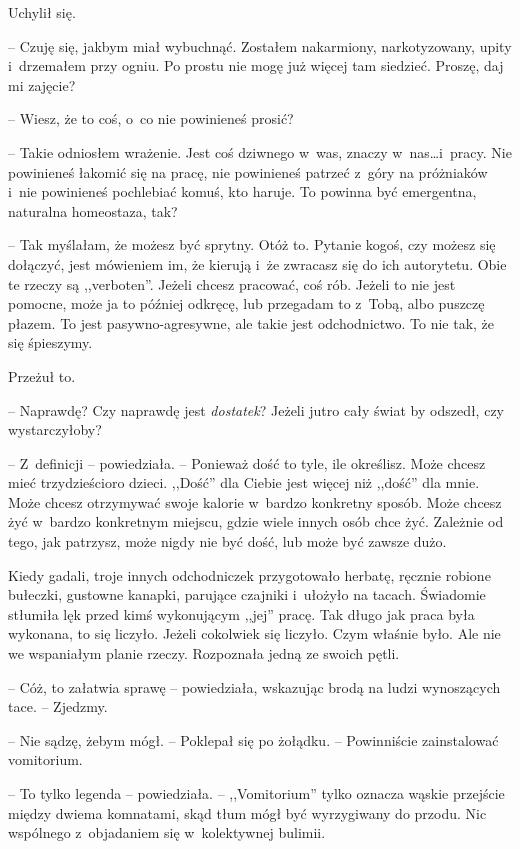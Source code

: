 \documentclass[oneside,polish,11pt,sfheadings]{mwbk}
\begin{document}
Uchylił się. 

-- Czuję się, jakbym miał wybuchnąć. Zostałem nakarmiony,
narkotyzowany, upity i~drzemałem przy ogniu. Po prostu nie mogę już
więcej tam siedzieć. Proszę, daj mi zajęcie?

-- Wiesz, że to coś, o~co nie powinieneś prosić?

-- Takie odniosłem wrażenie. Jest coś dziwnego w~was, znaczy w~nas\ldots  i~pracy. Nie powinieneś łakomić się na pracę, nie powinieneś patrzeć z~góry na próżniaków i~nie powinieneś pochlebiać komuś, kto haruje. To
powinna być emergentna, naturalna homeostaza, tak?

-- Tak myślałam, że możesz być sprytny. Otóż to. Pytanie kogoś, czy
możesz się dołączyć, jest mówieniem im, że kierują i~że zwracasz się do
ich autorytetu. Obie te rzeczy są ,,verboten''. Jeżeli chcesz pracować,
coś rób. Jeżeli to nie jest pomocne, może ja to później odkręcę, lub
przegadam to z~Tobą, albo puszczę płazem. To jest pasywno-agresywne, ale
takie jest odchodnictwo. To nie tak, że się śpieszymy.

Przeżuł to. 

-- Naprawdę? Czy naprawdę jest \textit{dostatek}? Jeżeli jutro
cały świat by odszedł, czy wystarczyłoby?

-- Z~definicji -- powiedziała. -- Ponieważ dość to tyle, ile określisz.
Może chcesz mieć trzydzieścioro dzieci. ,,Dość'' dla Ciebie jest więcej
niż ,,dość'' dla mnie. Może chcesz otrzymywać swoje kalorie w~bardzo
konkretny sposób. Może chcesz żyć w~bardzo konkretnym miejscu, gdzie
wiele innych osób chce żyć. Zależnie od tego, jak patrzysz, może nigdy
nie być dość, lub może być zawsze dużo.

Kiedy gadali, troje innych odchodniczek przygotowało herbatę, ręcznie
robione bułeczki, gustowne kanapki, parujące czajniki i~ułożyło na
tacach. Świadomie stłumiła lęk przed kimś wykonującym ,,jej'' pracę. Tak
długo jak praca była wykonana, to się liczyło. Jeżeli cokolwiek się
liczyło. Czym właśnie było. Ale nie we wspaniałym planie rzeczy.
Rozpoznała jedną ze swoich pętli.

-- Cóż, to załatwia sprawę -- powiedziała, wskazując brodą na ludzi
wynoszących tace. -- Zjedzmy.

-- Nie sądzę, żebym mógł. -- Poklepał się po żołądku. -- Powinniście
zainstalować vomitorium.

-- To tylko legenda -- powiedziała. -- ,,Vomitorium'' tylko oznacza wąskie
przejście między dwiema komnatami, skąd tłum mógł być wyrzygiwany do
przodu. Nic wspólnego z~objadaniem się w~kolektywnej bulimii.
\end{document}
